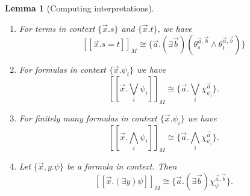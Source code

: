 \documentclass[a4paper]{amsproc}
\theoremstyle{plain}
\newtheorem{lemma}[theorem]{Lemma}
\theoremstyle{definition}
\theoremstyle{remark}
\numberwithin{equation}{section}
\newcommand{\ldoub}{[\![ }
\newcommand{\rdoub}{]\!]}
\begin{document}
\begin{lemma} [Computing interpretations]
\begin{itemize}
\begin{enumerate}
\item For terms in context $\{\vec{x} . s\}$ and $\{\vec{x} . t\}$, we have
\[
\ldoub\vec{x} . s = t \rdoub_M \cong \{\vec{a} . (\exists \vec{b}) (\theta_s^{\vec{a}, \vec{b}} \wedge \theta_t^{\vec{a}, \vec{b}}) \}
\]
\item For formulas in context $\{\vec{x} . \psi_i\}$ we have
\[
\ldoub\vec{x} . \bigvee_i \psi_i \rdoub_M \cong \big \{ \vec{a} . \bigvee_i \chi_{\psi_i}^{\vec{a}} \big \} . 
\]
\item For finitely many formulas in context $\{\vec{x} . \psi_i\}$ we have
\[
\ldoub\vec{x} . \bigwedge_i \psi_i \rdoub_M \cong \big \{ \vec{a} . \bigwedge_i \chi_{\psi_i}^{\vec{a}} \big \} . 
\]
\item Let $\{\vec{x}, y . \psi \}$ be a formula in context. Then
\[
\ldoub\vec{x} . (\exists y) \psi\rdoub_M \cong \{\vec{a} . (\exists \vec{b}) \chi^{\vec{a}, \vec{b}}_{\psi} \} .
\]
\end{enumerate}
\end{itemize}

\end{lemma}
\end{document}
